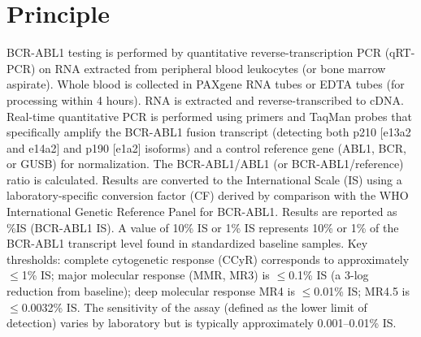 \section*{Principle}
BCR-ABL1 testing is performed by quantitative reverse-transcription PCR (qRT-PCR) on RNA extracted from peripheral blood leukocytes (or bone marrow aspirate). Whole blood is collected in PAXgene RNA tubes or EDTA tubes (for processing within 4 hours). RNA is extracted and reverse-transcribed to cDNA. Real-time quantitative PCR is performed using primers and TaqMan probes that specifically amplify the BCR-ABL1 fusion transcript (detecting both p210 [e13a2 and e14a2] and p190 [e1a2] isoforms) and a control reference gene (ABL1, BCR, or GUSB) for normalization. The BCR-ABL1/ABL1 (or BCR-ABL1/reference) ratio is calculated. Results are converted to the International Scale (IS) using a laboratory-specific conversion factor (CF) derived by comparison with the WHO International Genetic Reference Panel for BCR-ABL1. Results are reported as \%IS (BCR-ABL1 IS). A value of 10\% IS or 1\% IS represents 10\% or 1\% of the BCR-ABL1 transcript level found in standardized baseline samples. Key thresholds: complete cytogenetic response (CCyR) corresponds to approximately $\leq$1\% IS; major molecular response (MMR, MR3) is $\leq$0.1\% IS (a 3-log reduction from baseline); deep molecular response MR4 is $\leq$0.01\% IS; MR4.5 is $\leq$0.0032\% IS. The sensitivity of the assay (defined as the lower limit of detection) varies by laboratory but is typically approximately 0.001--0.01\% IS.

